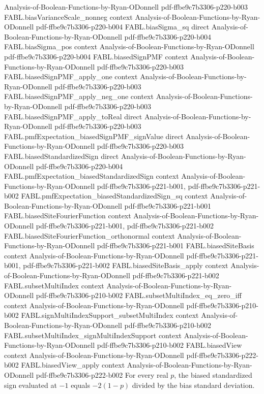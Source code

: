 \begin{theorem}
  {Analysis-of-Boolean-Functions-by-Ryan-ODonnell}
  {pdf-ffbe9c7b3306-p220-b003}
\proofstep
  {FABL.biasVarianceScale_nonneg}
  {context}
  {Analysis-of-Boolean-Functions-by-Ryan-ODonnell}
  {pdf-ffbe9c7b3306-p220-b004}
\proofstep
  {FABL.biasSigma_sq}
  {direct}
  {Analysis-of-Boolean-Functions-by-Ryan-ODonnell}
  {pdf-ffbe9c7b3306-p220-b004}
\proofstep
  {FABL.biasSigma_pos}
  {context}
  {Analysis-of-Boolean-Functions-by-Ryan-ODonnell}
  {pdf-ffbe9c7b3306-p220-b004}
\proofstep
  {FABL.biasedSignPMF}
  {context}
  {Analysis-of-Boolean-Functions-by-Ryan-ODonnell}
  {pdf-ffbe9c7b3306-p220-b003}
\proofstep
  {FABL.biasedSignPMF_apply_one}
  {context}
  {Analysis-of-Boolean-Functions-by-Ryan-ODonnell}
  {pdf-ffbe9c7b3306-p220-b003}
\proofstep
  {FABL.biasedSignPMF_apply_neg_one}
  {context}
  {Analysis-of-Boolean-Functions-by-Ryan-ODonnell}
  {pdf-ffbe9c7b3306-p220-b003}
\proofstep
  {FABL.biasedSignPMF_apply_toReal}
  {direct}
  {Analysis-of-Boolean-Functions-by-Ryan-ODonnell}
  {pdf-ffbe9c7b3306-p220-b003}
\proofstep
  {FABL.pmfExpectation_biasedSignPMF_signValue}
  {direct}
  {Analysis-of-Boolean-Functions-by-Ryan-ODonnell}
  {pdf-ffbe9c7b3306-p220-b003}
\proofstep
  {FABL.biasedStandardizedSign}
  {direct}
  {Analysis-of-Boolean-Functions-by-Ryan-ODonnell}
  {pdf-ffbe9c7b3306-p220-b004}
\proofstep
  {FABL.pmfExpectation_biasedStandardizedSign}
  {context}
  {Analysis-of-Boolean-Functions-by-Ryan-ODonnell}
  {pdf-ffbe9c7b3306-p221-b001,
    pdf-ffbe9c7b3306-p221-b002}
\proofstep
  {FABL.pmfExpectation_biasedStandardizedSign_sq}
  {context}
  {Analysis-of-Boolean-Functions-by-Ryan-ODonnell}
  {pdf-ffbe9c7b3306-p221-b001}
\proofstep
  {FABL.biasedSiteFourierFunction}
  {context}
  {Analysis-of-Boolean-Functions-by-Ryan-ODonnell}
  {pdf-ffbe9c7b3306-p221-b001,
    pdf-ffbe9c7b3306-p221-b002}
\proofstep
  {FABL.biasedSiteFourierFunction_orthonormal}
  {context}
  {Analysis-of-Boolean-Functions-by-Ryan-ODonnell}
  {pdf-ffbe9c7b3306-p221-b001}
\proofstep
  {FABL.biasedSiteBasis}
  {context}
  {Analysis-of-Boolean-Functions-by-Ryan-ODonnell}
  {pdf-ffbe9c7b3306-p221-b001,
    pdf-ffbe9c7b3306-p221-b002}
\proofstep
  {FABL.biasedSiteBasis_apply}
  {context}
  {Analysis-of-Boolean-Functions-by-Ryan-ODonnell}
  {pdf-ffbe9c7b3306-p221-b002}
\proofstep
  {FABL.subsetMultiIndex}
  {context}
  {Analysis-of-Boolean-Functions-by-Ryan-ODonnell}
  {pdf-ffbe9c7b3306-p210-b002}
\proofstep
  {FABL.subsetMultiIndex_eq_zero_iff}
  {context}
  {Analysis-of-Boolean-Functions-by-Ryan-ODonnell}
  {pdf-ffbe9c7b3306-p210-b002}
\proofstep
  {FABL.signMultiIndexSupport_subsetMultiIndex}
  {context}
  {Analysis-of-Boolean-Functions-by-Ryan-ODonnell}
  {pdf-ffbe9c7b3306-p210-b002}
\proofstep
  {FABL.subsetMultiIndex_signMultiIndexSupport}
  {context}
  {Analysis-of-Boolean-Functions-by-Ryan-ODonnell}
  {pdf-ffbe9c7b3306-p210-b002}
\proofstep
  {FABL.biasedView}
  {context}
  {Analysis-of-Boolean-Functions-by-Ryan-ODonnell}
  {pdf-ffbe9c7b3306-p222-b002}
\proofstep
  {FABL.biasedView_apply}
  {context}
  {Analysis-of-Boolean-Functions-by-Ryan-ODonnell}
  {pdf-ffbe9c7b3306-p222-b002}
For every real $p$, the biased standardized sign evaluated at $-1$ equals $-2(1-p)$
divided by the bias standard deviation.
\end{theorem}

